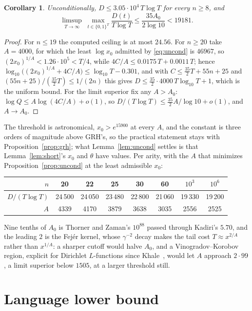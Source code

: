 \documentclass[11pt]{article}
\newtheorem{corollary}[theorem]{Corollary}
\theoremstyle{remark}
\begin{document}
\begin{corollary}\label{cor:uncond}
Unconditionally, $D\le3.05\cdot10^4\,T\log T$ for every $n\ge8$, and
\[
  \limsup_{T\to\infty}\;\max_{t\in\{0,1\}^T}\frac{D(t)}{T\log T}
  \le\frac{35A_0}{2\log10}<19181 .
\]
\end{corollary}

\begin{proof}
For $n\le19$ the computed ceiling is at most $24.56$.  For $n\ge20$ take
$A=4000$, for which the least $\log x_0$ admitted by \eqref{eq:uncond} is
$46967$, so $(2x_0)^{1/A}<1.26\cdot10^5<T/4$, while
$4C/A\le0.0175\,T+0.0011\,T$; hence
$\log_{10}\bigl((2x_0)^{1/A}+4C/A\bigr)\le\log_{10}T-0.301$, and with
$C\le\frac{35}2T+55n+25$ and $(55n+25)/(\frac{35}2T)\le1/(2n)$ this gives
$D\le\frac{35}2\cdot4000\,T\log_{10}T+1$, which is the uniform bound.  For
the limit superior fix any $A>A_0$: $\log Q\le A\log(4C/A)+o(1)$, so
$D/(T\log T)\le\frac{35}2A/\log10+o(1)$, and $A\to A_0$.
\end{proof}

The threshold is astronomical, $x_0>e^{15900}$ at every $A$, and the
constant is three orders of magnitude above GRH's, so the practical
statement stays with Proposition~\ref{prop:grh}; what
Lemma~\ref{lem:uncond} settles is that Lemma~\ref{lem:short}'s $x_0$ and
$\theta$ have values.  Per arity, with the $A$ that minimizes
Proposition~\ref{prop:uncond} at the least admissible $x_0$:

\begin{center}
\begin{tabular}{r|ccccccc}
$n$ & 20 & 22 & 25 & 30 & 60 & $10^3$ & $10^6$\\ \hline
$D/(T\log T)$ & 24\,500 & 24\,050 & 23\,480 & 22\,800 & 21\,060 & 19\,330
& 19\,200\\
$A$ & 4339 & 4170 & 3879 & 3638 & 3035 & 2556 & 2525
\end{tabular}
\end{center}

\noindent
Nine tenths of $A_0$ is Thorner and Zaman's $10^{88}$ passed through
Kadiri's $5.70$, and the leading $2$ is the Fej\'er kernel, whose
$\gamma^{-2}$ decay makes the tail cost $T\approx x^{2/A}$ rather than
$x^{1/A}$: a sharper cutoff would halve $A_0$, and a Vinogradov--Korobov
region, explicit for Dirichlet $L$-functions since Khale~\cite{khale},
would let $A$ approach $2\cdot99$, a limit superior below $1505$, at a
larger threshold still.

\section{Language lower bound}
\end{document}
